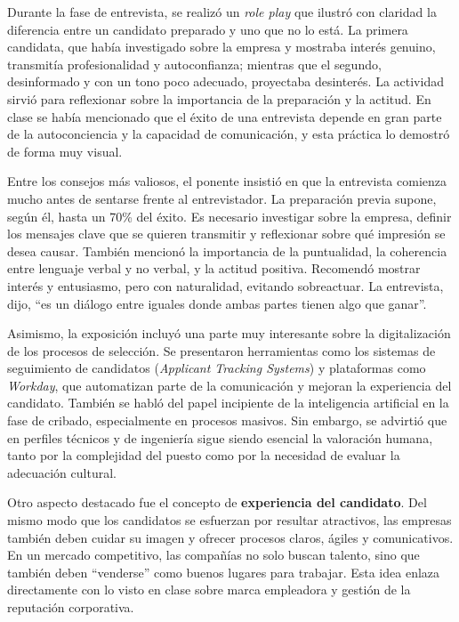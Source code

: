 Durante la fase de entrevista, se realizó un \textit{role play} que ilustró con claridad la diferencia entre un candidato preparado y uno que no lo está. La primera candidata, que había investigado sobre la empresa y mostraba interés genuino, transmitía profesionalidad y autoconfianza; mientras que el segundo, desinformado y con un tono poco adecuado, proyectaba desinterés. La actividad sirvió para reflexionar sobre la importancia de la preparación y la actitud. En clase se había mencionado que el éxito de una entrevista depende en gran parte de la autoconciencia y la capacidad de comunicación, y esta práctica lo demostró de forma muy visual.  

Entre los consejos más valiosos, el ponente insistió en que la entrevista comienza mucho antes de sentarse frente al entrevistador. La preparación previa supone, según él, hasta un 70\% del éxito. Es necesario investigar sobre la empresa, definir los mensajes clave que se quieren transmitir y reflexionar sobre qué impresión se desea causar. También mencionó la importancia de la puntualidad, la coherencia entre lenguaje verbal y no verbal, y la actitud positiva. Recomendó mostrar interés y entusiasmo, pero con naturalidad, evitando sobreactuar. La entrevista, dijo, “es un diálogo entre iguales donde ambas partes tienen algo que ganar”.  

Asimismo, la exposición incluyó una parte muy interesante sobre la digitalización de los procesos de selección. Se presentaron herramientas como los sistemas de seguimiento de candidatos (\textit{Applicant Tracking Systems}) y plataformas como \textit{Workday}, que automatizan parte de la comunicación y mejoran la experiencia del candidato. También se habló del papel incipiente de la inteligencia artificial en la fase de cribado, especialmente en procesos masivos. Sin embargo, se advirtió que en perfiles técnicos y de ingeniería sigue siendo esencial la valoración humana, tanto por la complejidad del puesto como por la necesidad de evaluar la adecuación cultural.  

Otro aspecto destacado fue el concepto de \textbf{experiencia del candidato}. Del mismo modo que los candidatos se esfuerzan por resultar atractivos, las empresas también deben cuidar su imagen y ofrecer procesos claros, ágiles y comunicativos. En un mercado competitivo, las compañías no solo buscan talento, sino que también deben “venderse” como buenos lugares para trabajar. Esta idea enlaza directamente con lo visto en clase sobre marca empleadora y gestión de la reputación corporativa.  

